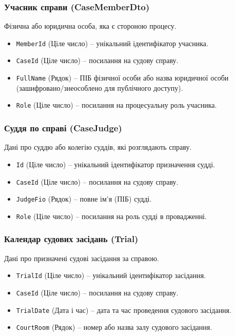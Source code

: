 \documentclass{article}
\begin{document}
\subsubsection{Учасник справи (CaseMemberDto)}
Фізична або юридична особа, яка є стороною процесу.
\begin{itemize}
    \item \texttt{MemberId} (Ціле число) -- унікальний ідентифікатор учасника.
    \item \texttt{CaseId} (Ціле число) -- посилання на судову справу.
    \item \texttt{FullName} (Рядок) -- ПІБ фізичної особи або назва юридичної особи (зашифровано/знеособлено для публічного доступу).
    \item \texttt{Role} (Ціле число) -- посилання на процесуальну роль учасника.
\end{itemize}

\subsubsection{Суддя по справі (CaseJudge)}
Дані про суддю або колегію суддів, які розглядають справу.
\begin{itemize}
    \item \texttt{Id} (Ціле число) -- унікальний ідентифікатор призначення судді.
    \item \texttt{CaseId} (Ціле число) -- посилання на судову справу.
    \item \texttt{JudgeFio} (Рядок) -- повне ім'я (ПІБ) судді.
    \item \texttt{Role} (Ціле число) -- посилання на роль судді в провадженні.
\end{itemize}

\subsubsection{Календар судових засідань (Trial)}
Дані про призначені судові засідання за справою.
\begin{itemize}
    \item \texttt{TrialId} (Ціле число) -- унікальний ідентифікатор засідання.
    \item \texttt{CaseId} (Ціле число) -- посилання на судову справу.
    \item \texttt{TrialDate} (Дата і час) -- дата та час проведення судового засідання.
    \item \texttt{CourtRoom} (Рядок) -- номер або назва залу судового засідання.
\end{itemize}
\end{document}
